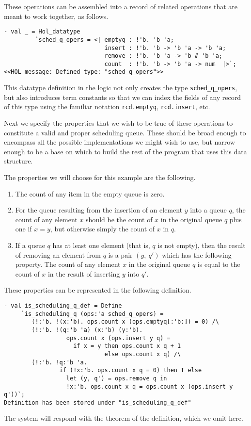 These operations can be assembled into a record of related operations
that are meant to work together, as follows.
\begin{session}
\begin{verbatim}
- val _ = Hol_datatype
         `sched_q_opers = <| emptyq : !'b. 'b 'a;
                             insert : !'b. 'b -> 'b 'a -> 'b 'a;
                             remove : !'b. 'b 'a -> 'b # 'b 'a;
                             count  : !'b. 'b -> 'b 'a -> num  |>`;
<<HOL message: Defined type: "sched_q_opers">>
\end{verbatim}
\end{session}
This datatype definition in the \HOLW{} logic not only creates the 
type {\tt sched\_q\_opers}, but also introduces term constants so that
we can index the fields of any record of this type using the familiar
notation {\tt rcd.emptyq}, {\tt rcd.insert}, etc.

Next we specify the properties that we wish to be true of these operations
to constitute a valid and proper scheduling queue. These should be broad
enough to encompass all the possible implementations we might wish to use,
but narrow enough to be a base on which to build the rest of the program
that uses this data structure.

The properties we will choose for this example are the following.
\begin{enumerate}
\item The count of any item in the empty queue is zero.
\item For the queue resulting from the insertion of an element $y$ 
into a queue $q$, the count of any element $x$ should be the
count of $x$ in the original queue $q$ plus one if $x = y$,
but otherwise simply the count of $x$ in $q$.
\item If a queue $q$ has at least one element (that is, $q$ is not
empty), then the result of removing an element from $q$ is a pair
$(y,\ q')$ which has the following property.
The count of any element $x$ in the original queue $q$ is equal 
to the count of $x$ in the result of inserting $y$ into $q'$.
\end{enumerate}

These properties can be represented in the following definition.
\begin{session}
\begin{verbatim}
- val is_scheduling_q_def = Define
     `is_scheduling_q (ops:'a sched_q_opers) =
        (!:'b. !(x:'b). ops.count x (ops.emptyq[:'b:]) = 0) /\
        (!:'b. !(q:'b 'a) (x:'b) (y:'b).
                  ops.count x (ops.insert y q) =
                    if x = y then ops.count x q + 1
                             else ops.count x q) /\
        (!:'b. !q:'b 'a.
                if (!x:'b. ops.count x q = 0) then T else
                  let (y, q') = ops.remove q in
                  !x:'b. ops.count x q = ops.count x (ops.insert y q'))`;
Definition has been stored under "is_scheduling_q_def"
\end{verbatim}
\end{session}
The system will respond with the theorem of the definition, which we omit here.

